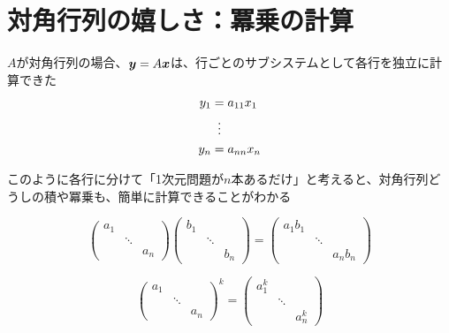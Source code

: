 \documentclass[../../../topic_linear-algebra]{subfiles}
\begin{document}
\sectionline
\section{対角行列の嬉しさ：冪乗の計算}

$A$が対角行列の場合、$\vb*{y} = A\vb*{x}$は、行ごとのサブシステムとして各行を独立に計算できた
\begin{align*}
  y_1 & = a_{11} x_1    \\
      & \vdotswithin{=} \\
  y_n & = a_{nn} x_n
\end{align*}

\br

このように各行に分けて「1次元問題が$n$本あるだけ」と考えると、対角行列どうしの積や冪乗も、簡単に計算できることがわかる

\begin{equation*}
  \begin{pmatrix}
    a_1 &        &     \\
        & \ddots &     \\
        &        & a_n
  \end{pmatrix} \begin{pmatrix}
    b_1 &        &     \\
        & \ddots &     \\
        &        & b_n
  \end{pmatrix} = \begin{pmatrix}
    a_1 b_1 &        &         \\
            & \ddots &         \\
            &        & a_n b_n
  \end{pmatrix}
\end{equation*}

\br

\begin{equation*}
  \begin{pmatrix}
    a_1 &        &     \\
        & \ddots &     \\
        &        & a_n
  \end{pmatrix}^k = \begin{pmatrix}
    a_1^k &        &       \\
          & \ddots &       \\
          &        & a_n^k
  \end{pmatrix}
\end{equation*}
\end{document}
